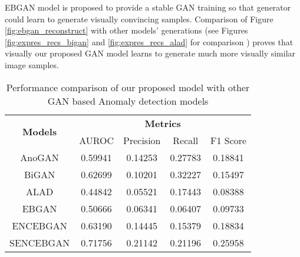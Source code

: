 EBGAN model is proposed to provide a stable GAN training so that generator could learn to generate visually convincing samples. 
Comparison of Figure \ref{fig:ebgan_reconstruct} with other models' generations (see Figures \ref{fig:expres_recs_bigan} and \ref{fig:expres_recs_alad} for comparison ) proves that visually our proposed GAN model learns to generate much more visually similar image samples.

\begin{longtable}[c]{|c|cccc|}
	\caption{Performance  comparison of our proposed model with other GAN based Anomaly detection models}
	\label{tab:proposed_baseline}\\
	\hline
	\multirow{2}{*}{\textbf{Models}} & \multicolumn{4}{c|}{\textbf{Metrics}} \\ \cline{2-5} 
	& AUROC & Precision & Recall & F1 Score \\ \hline
	\endhead
	\multicolumn{1}{|c|}{AnoGAN} & \multicolumn{1}{c}{0.59941} & \multicolumn{1}{c}{0.14253} & \multicolumn{1}{c}{0.27783} & \multicolumn{1}{c|}{0.18841} \\ \hline
	\multicolumn{1}{|c|}{BiGAN} & \multicolumn{1}{c}{0.62699} & \multicolumn{1}{c}{0.10201} & \multicolumn{1}{c}{0.32227} & \multicolumn{1}{c|}{0.15497} \\ \hline
	\multicolumn{1}{|c|}{ALAD} & \multicolumn{1}{c}{0.44842} & \multicolumn{1}{c}{0.05521} & \multicolumn{1}{c}{0.17443} & \multicolumn{1}{c|}{0.08388} \\ \hline
	\multicolumn{1}{|c|}{EBGAN} & \multicolumn{1}{c}{0.50666} & \multicolumn{1}{c}{0.06341} & \multicolumn{1}{c}{0.06407} & \multicolumn{1}{c|}{0.09733} \\ \hline
	\multicolumn{1}{|c|}{ ENCEBGAN} & \multicolumn{1}{c}{0.63190} & \multicolumn{1}{c}{0.14445} & \multicolumn{1}{c}{0.15379} & \multicolumn{1}{c|}{0.18834} \\ \hline
	\multicolumn{1}{|c|}{ SENCEBGAN} & \multicolumn{1}{c}{0.71756} & \multicolumn{1}{c}{0.21142} & \multicolumn{1}{c}{0.21196} & \multicolumn{1}{c|}{0.25958} \\ \hline
\end{longtable}

